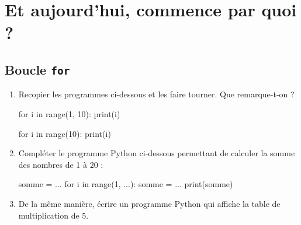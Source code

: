 \documentclass[12pt,a4paper, oneside]{article}
\theoremstyle{definition}
\begin{document}
\section{Et aujourd'hui, commence par quoi ?} \label{sec:et-aujourd'hui-on-fait-quoi-?}
   \subsection{Boucle \texttt{for}}\label{subsec:boucle-texttt-for}
   \begin{enumerate}
      \item Recopier les programmes ci-dessous et les faire tourner.
      Que remarque-t-on ?

      \begin{minipage}{.4\textwidth}
        \begin{pyverbatim}
      for i in range(1, 10):
         print(i)
        \end{pyverbatim}
        \end{minipage}
      \begin{minipage}{.4\textwidth}
         \begin{pyverbatim}
      for i in range(10):
         print(i)
         \end{pyverbatim}
        \end{minipage}

      \newpage

      \item Compléter le programme Python ci-dessous permettant de calculer la somme des nombres de 1 à 20 :
         \begin{pyverbatim}
           somme = ...
           for i in range(1, ...):
             somme = ...
           print(somme)
        \end{pyverbatim}
      \item De la même manière, écrire un programme Python qui affiche la table de multiplication de 5.
   \end{enumerate}
\end{document}
